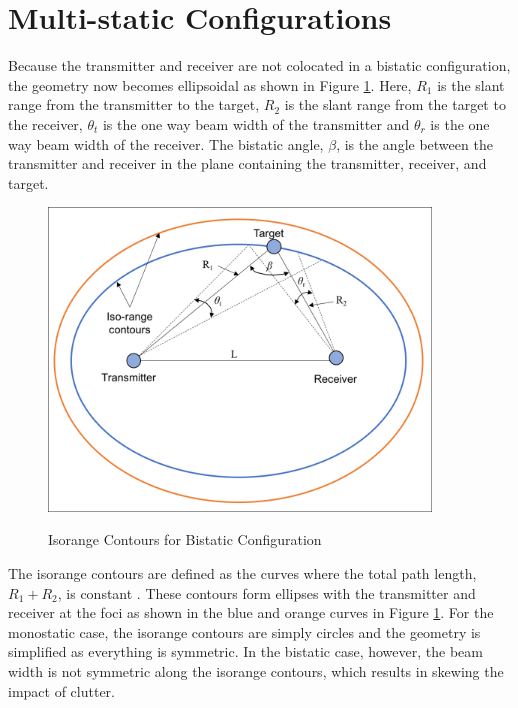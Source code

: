 \section{Multi-static Configurations}
Because the transmitter and receiver are not colocated in a bistatic configuration, the geometry now becomes ellipsoidal as shown in Figure \ref{intro_fig:2}. Here, $R_1$ is the slant range from the transmitter to the target, $R_2$ is the slant range from the target to the receiver, $\theta_t$ is the one way beam width of the transmitter and $\theta_r$ is the one way beam width of the receiver. The bistatic angle, $\beta$, is the angle between the transmitter and receiver in the plane containing the transmitter, receiver, and target. 
\begin{figure}[H]
  \begin{center}
\includegraphics[width=4in]{../media/multistatic/Isorange_contours.png}
  \end{center}
  \renewcommand{\baselinestretch}{1} \small\normalsize
  \begin{quote}
    \caption[Isorange Contours for Bistatic Configuration]{Isorange Contours for Bistatic Configuration \label{intro_fig:2}}
  \end{quote}
\end{figure}
\renewcommand{\baselinestretch}{2} \small\normalsize
The isorange contours are defined as the curves where the total path length, $R_1 + R_2$, is constant . These contours form ellipses with the transmitter and receiver at the foci as shown in the blue and orange curves in Figure \ref{intro_fig:2}. For the monostatic case, the isorange contours are simply circles and the geometry is simplified as everything is symmetric. In the bistatic case, however, the beam width is not symmetric along the isorange contours, which results in skewing the impact of clutter.

